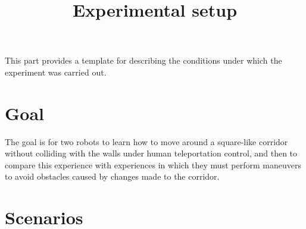 \documentclass[a4paper]{article}
\title{Experimental setup}
\author{}
\date{}
\begin{document}
   \maketitle
   This part provides a template for describing the conditions under which the experiment was carried out.

   \section{Goal}
      The goal is for two robots to learn how to move around a square-like corridor without colliding with the walls under human teleportation control, and then to compare this experience with experiences in which they must perform maneuvers to avoid obstacles caused by changes made to the corridor.
   
   \section{Scenarios}
   
   
\end{document}
